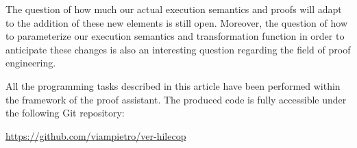 \documentclass[pdflatex,sn-mathphys]{sn-jnl}%
\theoremstyle{thmstyleone}%
\theoremstyle{thmstyletwo}%
\theoremstyle{thmstylethree}%
\begin{document}

The question of how much our actual execution semantics and proofs
will adapt to the addition of these new elements is still
open. Moreover, the question of how to parameterize our execution
semantics and transformation function in order to anticipate these
changes is also an interesting question regarding the field of proof
engineering.

All the programming tasks described in this article have been
performed within the framework of the \coq{} proof assistant. The
produced code is fully accessible under the following \textsf{Git}
repository:

\begin{center}
  \url{https://github.com/viampietro/ver-hilecop}
\end{center}

% 
% 
% 
% 
% 
% 
\end{document}
